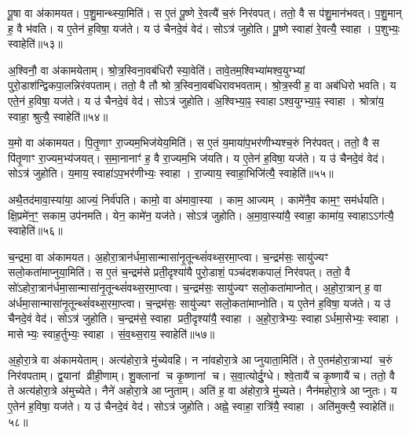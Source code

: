 पू॒षा वा अ॑कामयत।
प॒शु॒मान्थ्स्या॒मिति॑।
स ए॒तं पू॒ष्णे रे॒वत्यै॑ च॒रुं निर॑वपत्।
ततो॒ वै स प॑शु॒मान॑भवत्।
प॒शु॒मान् ह॒ वै भ॑वति।
य ए॒तेन॑ ह॒विषा॒ यज॑ते।
य उ॑ चैनदे॒वं वेद॑।
सोऽत्र॑ जुहोति।
पू॒ष्णे स्वाहा॑ रे॒वत्यै॒ स्वाहा।
प॒शुभ्यः॒ स्वाहेति॑॥५३॥

अ॒श्विनौ॒ वा अ॑कामयेताम्।
श्रो॒त्र॒स्विना॒वब॑धिरौ स्या॒वेति॑।
तावे॒तम॒श्विभ्या॑मश्व॒युग्भ्यां पुरो॒डाश॑न्द्विकपा॒लन्निर॑वपताम्।
ततो॒ वै तौ श्रोत्र॒स्विना॒वब॑धिरावभवताम्।
श्रो॒त्र॒स्वी ह॒ वा अब॑धिरो भवति।
य एते॒न॑ ह॒विषा॒ यज॑ते।
य उ॑ चैनदे॒वं वेद॑।
सोऽत्र॑ जुहोति।
अ॒श्विभ्या॒ꣴ॒ स्वाहा\-ऽश्व॒युग्भ्या॒ꣴ॒ स्वाहा।
श्रोत्रा॑य॒ स्वाहा॒ श्रुत्यै॒ स्वाहेति॑॥५४॥

य॒मो वा अ॑कामयत।
पि॒तृ॒णाꣳ रा॒ज्यम॒भिज॑येय॒मिति॑।
स ए॒तं य॒माया॑प॒भर॑णीभ्यश्च॒रुं निर॑पवत्।
ततो॒ वै स पि॑तृ॒णाꣳ रा॒ज्यम॒भ्य॑जयत्।
स॒मा॒नानाꣳ॑ ह॒ वै रा॒ज्यम॒भि ज॑यति।
य ए॒तेन॑ ह॒विषा॒ यज॑ते।
य उ॑ चैनदे॒वं वेद॑।
सोऽत्र॑ जुहोति।
य॒माय॒ स्वाहा॑\-ऽप॒भर॑णीभ्यः॒ स्वाहा।
रा॒ज्याय॒ स्वाहा॒भिजि॑त्यै॒ स्वाहेति॑॥५५॥

अथै॒तद॑मावा॒स्या॑या॒ आज्यं॒ निर्व॑पति।
कामो॒ वा अ॑मावा॒स्या।
काम॒ आज्यम्।
कामे॑नै॒व काम॒ꣳ॒ सम॑र्धयति।
क्षि॒प्रमे॑न॒ꣳ॒ सकाम॒ उप॑नमति।
येन॒ कामे॑न॒ यज॑ते।
सोऽत्र॑ जुहोति।
अ॒मा॒वा॒स्या॑यै॒ स्वाहा॒ कामा॑य॒ स्वाहा\-ऽऽग॑त्यै॒ स्वाहेति॑॥५६॥\anuvakamend[मि॒त्र इन्द्रः॑ प्र॒जाप॑ति॒र्दश॑ द॒शाप॒ एका॑दश॒ विश्वे॒ ब्रह्म॒ दश॑दश॒ विष्णु॒स्त्रयो॑दश॒ वस॑व॒ इन्द्रो॒\-ऽजो\-ऽहि॒र्वै बु॒ध्नियः॑ पू॒षा\-ऽश्विनौ॑ य॒मो दश॑ द॒शाथै॒तद॑मावा॒स्या॑या अ॒ष्टौ पञ्च॑दश]

च॒न्द्रमा॒ वा अ॑कामयत।
अ॒होरा॒त्रान॑र्धमा॒सान्मासा॑नृ॒तून्थ्सं॑\-वथ्स॒रमा॒प्त्वा।
च॒न्द्रम॑सः॒ सायु॑ज्यꣳ सलो॒कता॑माप्नुया॒मिति॑।
स ए॒तं च॒न्द्रम॑से प्रती॒दृश्या॑यै पुरो॒डाशं॒ पञ्च॑दशकपालं॒ निर॑वपत्।
ततो॒ वै सो॑\-ऽहोरा॒त्रान॑र्धमा॒सान्मासा॑नृ॒तून्थ्सं॑वथ्स॒र\-मा॒प्त्वा।
च॒न्द्रम॑सः॒ सायु॑ज्यꣳ सलो॒कता॑माप्नोत्।
अ॒हो॒रा॒त्रान् ह॒ वा अ॑र्धमा॒सान्मासा॑नृ॒तून्थ्सं॑वथ्स॒रमा॒प्त्वा।
च॒न्द्रम॑सः॒ सायु॑ज्यꣳ सलो॒कता॑माप्नोति।
य ए॒तेन॑ ह॒विषा॒ यज॑ते।
य उ॑ चैनदे॒वं वेद॑।
सोऽत्र॑ जुहोति।
च॒न्द्रम॑से॒ स्वाहा प्रती॒दृश्या॑यै॒ स्वाहा।
अ॒हो॒रा॒त्रेभ्यः॒ स्वाहा\-ऽर्धमा॒सेभ्यः॒ स्वाहा।
मासेभ्यः॒ स्वाह॒र्तुभ्यः॒ स्वाहा।
सं॒व॒थ्स॒राय॒ स्वाहेति॑॥५७॥

अ॒हो॒रा॒त्रे वा अ॑कामयेताम्।
अत्य॑होरा॒त्रे मु॑च्येवहि।
न ना॑वहोरा॒त्रे आप्नुयाता॒मिति॑।
ते ए॒तम॑होरा॒त्राभ्यां च॒रुं निर॑वपताम्।
द्व॒यानां व्रीही॒णाम्।
शु॒क्लानां च कृ॒ष्णानां च।
स॒वा॒त्योर्दु॒ग्धे।
श्वे॒तायै॑ च कृ॒ष्णायै॑ च।
ततो॒ वै ते अत्य॑होरा॒त्रे अ॑मुच्येते।
नैने॑ अहोरा॒त्रे आप्नुताम्।
अति॑ ह॒ वा अ॑होरा॒त्रे मु॑च्यते।
नैन॑महोरा॒त्रे आप्नुतः।
य ए॒तेन॑ ह॒विषा॒ यज॑ते।
य उ॑ चैनदे॒वं वेद॑।
सोऽत्र॑ जुहोति।
अह्ने॒ स्वाहा॒ रात्रि॑यै॒ स्वाहा।
अति॑मुक्त्यै॒ स्वाहेति॑॥५८॥

